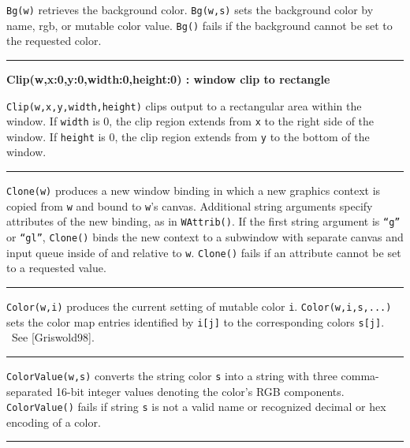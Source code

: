 \noindent
\texttt{Bg(w)} retrieves the background color. \texttt{Bg(w,s)} sets the
background color by name, rgb, or mutable color value. \texttt{Bg()}
fails if the background cannot be set to the requested color.

\bigskip\hrule\vspace{0.1cm}
\noindent
{\bf Clip(w,x:0,y:0,width:0,height:0) : window \hfill clip to rectangle}

\noindent
\texttt{Clip(w,x,y,width,height)} clips output to a rectangular area
within the window. If \texttt{width} is 0, the clip region extends
from \texttt{x} to the right side of the window. If \texttt{height}
is 0, the clip region extends from \texttt{y} to the bottom of the
window.

\bigskip\hrule\vspace{0.1cm}

\noindent
\texttt{Clone(w)} produces a new window binding in which a new graphics
context is copied from \texttt{w} and bound to
\texttt{w}'s canvas. Additional string arguments
specify attributes of the new binding, as in \texttt{WAttrib()}. If the
first string argument is
\texttt{{\textquotedblleft}g{\textquotedblright}} or
\texttt{{\textquotedblleft}gl{\textquotedblright}}, \texttt{Clone()}
binds the new context to a subwindow with separate canvas and input
queue inside of and relative to \texttt{w}. \texttt{Clone()} fails if
an attribute cannot be set to a requested value.

\bigskip\hrule\vspace{0.1cm}

\noindent
\texttt{Color(w,i)} produces the current setting of mutable color
\texttt{i}. \texttt{Color(w,i,s,...)} sets the color map entries
identified by \texttt{i[j]} to the corresponding colors \texttt{s[j]}.
\ See [Griswold98].

\bigskip\hrule\vspace{0.1cm}

\noindent
\texttt{ColorValue(w,s)} converts the string color \texttt{s} into a
string with three comma-separated 16-bit integer values denoting the
color's RGB components. \texttt{ColorValue()} fails if
string \texttt{s} is not a valid name or recognized decimal or hex
encoding of a color.

\bigskip\hrule\vspace{0.1cm}

